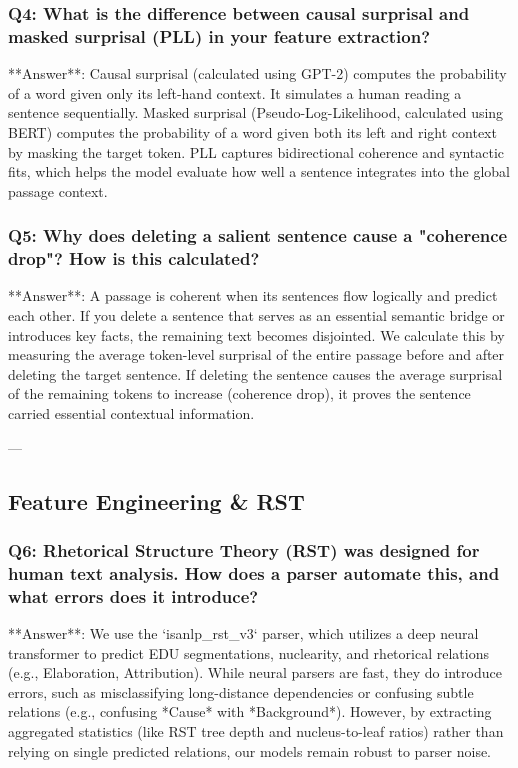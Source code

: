 \documentclass[11pt,a4paper]{article}
\begin{document}
\subsubsection{Q4: What is the difference between causal surprisal and masked surprisal (PLL) in your feature extraction?}
**Answer**: Causal surprisal (calculated using GPT-2) computes the probability of a word given only its left-hand context. It simulates a human reading a sentence sequentially. 
Masked surprisal (Pseudo-Log-Likelihood, calculated using BERT) computes the probability of a word given both its left and right context by masking the target token. PLL captures bidirectional coherence and syntactic fits, which helps the model evaluate how well a sentence integrates into the global passage context.

\subsubsection{Q5: Why does deleting a salient sentence cause a "coherence drop"? How is this calculated?}
**Answer**: A passage is coherent when its sentences flow logically and predict each other. If you delete a sentence that serves as an essential semantic bridge or introduces key facts, the remaining text becomes disjointed. 
We calculate this by measuring the average token-level surprisal of the entire passage before and after deleting the target sentence. If deleting the sentence causes the average surprisal of the remaining tokens to increase (coherence drop), it proves the sentence carried essential contextual information.

---

\subsection{Feature Engineering \& RST}

\subsubsection{Q6: Rhetorical Structure Theory (RST) was designed for human text analysis. How does a parser automate this, and what errors does it introduce?}
**Answer**: We use the `isanlp\_rst\_v3` parser, which utilizes a deep neural transformer to predict EDU segmentations, nuclearity, and rhetorical relations (e.g., Elaboration, Attribution). 
While neural parsers are fast, they do introduce errors, such as misclassifying long-distance dependencies or confusing subtle relations (e.g., confusing *Cause* with *Background*). However, by extracting aggregated statistics (like RST tree depth and nucleus-to-leaf ratios) rather than relying on single predicted relations, our models remain robust to parser noise.
\end{document}
